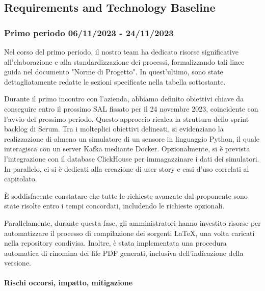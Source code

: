 \subsection{Requirements and Technology Baseline}
\subsubsection{Primo periodo  06/11/2023 - 24/11/2023}
    Nel corso del primo periodo, il nostro team ha dedicato risorse significative all'elaborazione e alla standardizzazione dei processi, formalizzando tali linee guida nel documento "Norme di Progetto". In quest'ultimo, sono state dettagliatamente redatte le sezioni specificate nella tabella sottostante.

    Durante il primo incontro con l'azienda, abbiamo definito obiettivi chiave da conseguire entro il prossimo SAL fissato per il 24 novembre 2023, coincidente con l'avvio del prossimo periodo. Questo approccio ricalca la struttura dello sprint backlog di Scrum.
    Tra i molteplici obiettivi delineati, si evidenziano la realizzazione di almeno un simulatore di un sensore in linguaggio Python, il quale interagisca con un server Kafka mediante Docker. Opzionalmente, si è prevista l'integrazione con il database ClickHouse per immagazzinare i dati dei simulatori. In parallelo, ci si è dedicati alla creazione di user story e casi d'uso correlati al capitolato.

    È soddisfacente constatare che tutte le richieste avanzate dal proponente sono state risolte entro i tempi concordati, includendo le richieste opzionali.

    Parallelamente, durante questa fase, gli amministratori hanno investito risorse per automatizzare il processo di compilazione dei sorgenti \LaTeX , una volta caricati nella repository condivisa. Inoltre, è stata implementata una procedura automatica di rinomina dei file PDF generati, inclusiva dell'indicazione della versione.

\paragraph{Rischi occorsi, impatto, mitigazione} 

